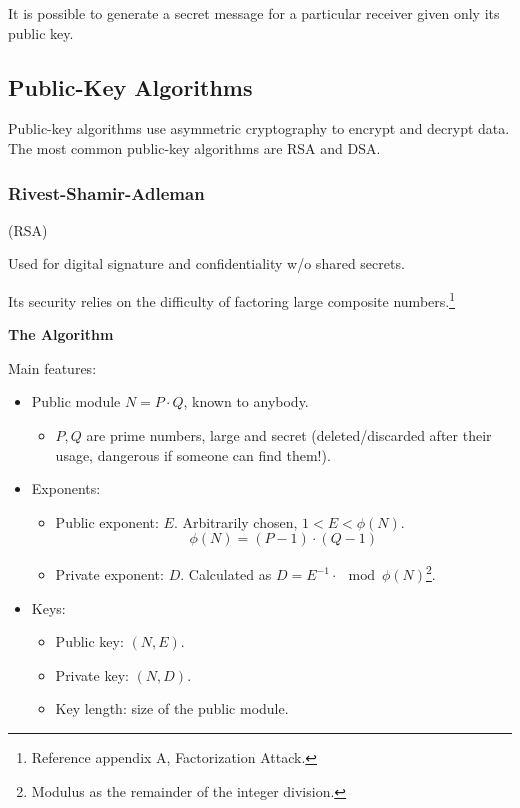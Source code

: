 \begin{tcolorbox}[colback=blue!10!white, colframe=blue!50!white, title=Confidentiality Without Shared Secrets]
It is possible to generate a secret message for a particular receiver given only its public key.
\end{tcolorbox}

\subsection{Public-Key Algorithms}
Public-key algorithms use asymmetric cryptography to encrypt and decrypt data. The most common public-key algorithms are RSA and DSA.

\subsubsection{Rivest-Shamir-Adleman}
\begin{center}
    (RSA)
\end{center}

Used for digital signature and confidentiality w/o shared secrets.

\begin{tcolorbox}[colback=red!10!white, colframe=red!70!black, coltitle=white, title=Beware]
    Its security relies on the difficulty of factoring large composite numbers.\footnote{Reference appendix A, Factorization Attack.}
\end{tcolorbox}

\begin{center}
    \textbf{The Algorithm}
\end{center}

Main features:
\begin{itemize}
    \item Public module $N = P \cdot Q$, known to anybody.
    \begin{itemize}
        \item $P, Q$ are prime numbers, large and secret (deleted/discarded after their usage, dangerous if someone can find them!).
    \end{itemize} 
    \item Exponents:
    \begin{itemize}
        \item Public exponent: $E$. Arbitrarily chosen, $1 < E < \phi(N)$.
        \[
            \phi(N) = (P-1) \cdot (Q-1)
        \]
        \item Private exponent: $D$. Calculated as $D = E^{-1}\cdot \mod \phi(N)$\footnote{Modulus as the remainder of the integer division.}.
    \end{itemize}
    \item Keys:
    \begin{itemize}
        \item Public key: $(N, E)$.
        \item Private key: $(N, D)$.
        \item Key length: size of the public module.
    \end{itemize}
\end{itemize}

